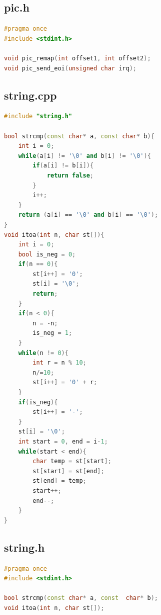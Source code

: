 \documentclass[12pt,a4paper]{report}
\begin{document}
\subsection{pic.h}
\begin{lstlisting}[language={C++}]
#pragma once
#include <stdint.h>

void pic_remap(int offset1, int offset2);
void pic_send_eoi(unsigned char irq);
\end{lstlisting}

\subsection{string.cpp}
\begin{lstlisting}[language={C++}]
#include "string.h"

bool strcmp(const char* a, const char* b){
    int i = 0;
    while(a[i] != '\0' and b[i] != '\0'){
        if(a[i] != b[i]){
            return false;
        }
        i++;
    }
    return (a[i] == '\0' and b[i] == '\0');
}
void itoa(int n, char st[]){
    int i = 0;
    bool is_neg = 0;
    if(n == 0){
        st[i++] = '0';
        st[i] = '\0';
        return;
    }
    if(n < 0){
        n = -n;
        is_neg = 1;
    }
    while(n != 0){
        int r = n % 10;
        n/=10;
        st[i++] = '0' + r;
    }
    if(is_neg){
        st[i++] = '-';
    }
    st[i] = '\0';
    int start = 0, end = i-1;
    while(start < end){
        char temp = st[start];
        st[start] = st[end];
        st[end] = temp;
        start++;
        end--;
    }
}
\end{lstlisting}

\subsection{string.h}
\begin{lstlisting}[language={C++}]
#pragma once
#include <stdint.h>

bool strcmp(const char* a, const  char* b);
void itoa(int n, char st[]);
\end{lstlisting}
\end{document}
